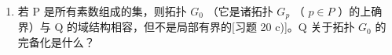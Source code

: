 \begin{enumerate}
\def\labelenumi{\alph{enumi})}
\setcounter{enumi}{1}
\tightlist
\item
  若 P 是所有素数组成的集，则拓扑 \(G_{0}\) （它是诸拓扑 \(G_{p}\) （ \(p \in P\) ）的上确界）与 Q 的域结构相容，但不是局部有界的{[}习题 20 c){]}。Q 关于拓扑 \(G_{0}\) 的完备化是什么？
\end{enumerate}

